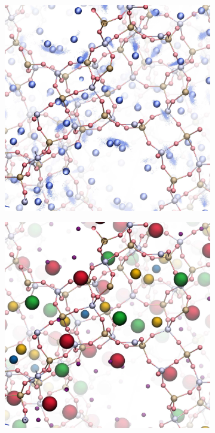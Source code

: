 \documentclass[main.tex]{subfiles}
\begin{document}
\begin{figure}
\begin{subfigure}{0.45\columnwidth}
		\label{fig:FAUdensity}
	\end{subfigure}\hfill

	\vspace{1em}

	\hfill\begin{subfigure}{0.45\columnwidth}
		\centering
		\includegraphics[width=\columnwidth]{figures/cations/FAU1_density_Na.jpg}
		\label{fig:FAUextraction}
	\end{subfigure}\hfill%
	\begin{subfigure}{0.45\columnwidth}
		\centering
		\includegraphics[width=\columnwidth]{figures/cations/FAU1_NaColors.jpg}

\end{subfigure}
\end{figure}
\end{document}
